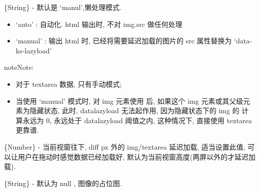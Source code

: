 \documentclass[letterpaper,10pt,english]{sphinxmanual}
\begin{document}
\begin{fulllineitems}
\label{api/component/datalazyload/index:DataLazyload.mod}
\{String\} - 默认是 `manul',懒处理模式.
\begin{itemize}
\item {}
`auto' : 自动化. html 输出时, 不对 img.src 做任何处理

\item {}
`manual' : 输出 html 时, 已经将需要延迟加载的图片的 src 属性替换为 `data-ks-lazyload'

\end{itemize}

\begin{notice}{note}{Note:}\begin{itemize}
\item {}
对于 textarea 数据, 只有手动模式;

\item {}
当使用 `manual' 模式时, 对 img 元素使用  后, 如果这个 img 元素或其父级元素为隐藏状态, 此时, datalazyload 无法起作用, 因为隐藏状态下的 img 的  计算永远为 0, 永远处于 datalazyload 阈值之内, 这种情况下, 直接使用 textarea 更靠谱.

\end{itemize}
\end{notice}

\end{fulllineitems}



\begin{fulllineitems}
\label{api/component/datalazyload/index:DataLazyload.diff}
\{Number\} - 当前视窗往下, diff px 外的 img/textarea 延迟加载, 适当设置此值, 可以让用户在拖动时感觉数据已经加载好, 默认为当前视窗高度(两屏以外的才延迟加载).

\end{fulllineitems}



\begin{fulllineitems}
\label{api/component/datalazyload/index:DataLazyload.placeholder}
\{String\} - 默认为 null , 图像的占位图.

\end{fulllineitems}


\end{document}
